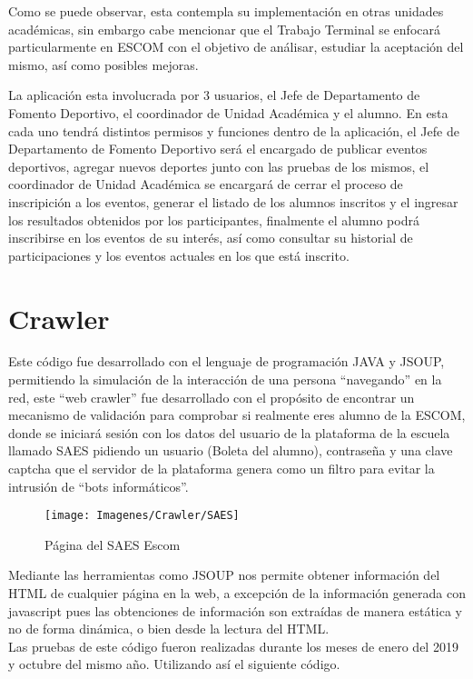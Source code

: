 	\noindent Como se puede observar, esta contempla su implementación en otras unidades académicas, sin embargo cabe mencionar que el Trabajo Terminal se enfocará particularmente en ESCOM con el objetivo de análisar, estudiar la aceptación del mismo, así como posibles mejoras.
	
	\noindet La aplicación esta involucrada por 3 usuarios, el Jefe de Departamento de Fomento Deportivo, el coordinador de Unidad Académica y el alumno. En esta cada uno tendrá distintos permisos y funciones dentro de la aplicación, el Jefe de Departamento de Fomento Deportivo será el encargado de publicar eventos deportivos, agregar nuevos deportes junto con las pruebas de los mismos, el coordinador de Unidad Académica se encargará de cerrar el proceso de inscripición a los eventos, generar el listado de los alumnos inscritos y el ingresar los resultados obtenidos por los participantes, finalmente el alumno podrá inscribirse en los eventos de su interés, así como consultar su historial de participaciones y los eventos actuales en los que está inscrito.
	
	
	\section{Crawler}
	\label{crawler}
	\noindent Este código fue desarrollado con el lenguaje de programación JAVA y JSOUP, permitiendo la simulación de la interacción de una persona “navegando” en la red, este “web crawler” fue desarrollado con el propósito de encontrar un mecanismo de validación para comprobar si realmente eres alumno de la ESCOM, donde se iniciará sesión con los datos del usuario de la plataforma de la escuela llamado SAES pidiendo un usuario (Boleta del alumno), contraseña y una clave captcha que el servidor de la plataforma genera como un filtro para evitar la intrusión de “bots informáticos”.\\
	
	\begin{figure}[hbt!]
		\centering
		\texttt{[image: Imagenes/Crawler/SAES]}
		\caption{Página del SAES Escom}
		\label{saes}
	\end{figure}
	
	\noindent Mediante las herramientas como JSOUP nos permite obtener información del HTML de cualquier página en la web, a excepción de la información generada con javascript pues las obtenciones de información son extraídas de manera estática y no de forma dinámica, o bien desde la lectura del HTML.\\
	\noindent Las pruebas de este código fueron realizadas durante los meses de enero del 2019 y octubre del mismo año. Utilizando así el siguiente código.
	\pagebreak
	
